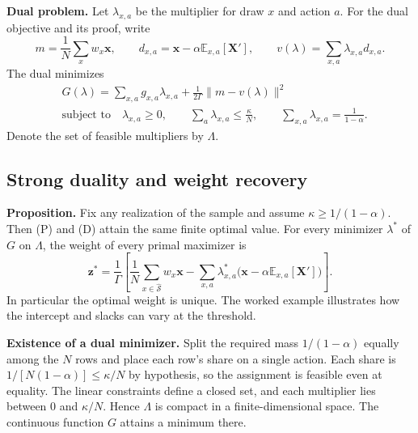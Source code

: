 \documentclass[12pt,a4paper]{article}
\numberwithin{equation}{section}
\newcommand{\norm}[1]{\lVert #1\rVert}
\newcommand{\lead}[1]{\par\smallskip\noindent\textbf{#1}\enspace}
\begin{document}
\lead{Dual problem.} Let \(\lambda_{x,a}\) be the multiplier for draw \(x\)
and action \(a\). For the dual objective and its proof, write
\[
 m=\frac1N\sum_x w_x\mathbf x,\qquad
 d_{x,a}=\mathbf x-\alpha\mathbb E_{x,a}[\mathbf X'],\qquad
 v(\lambda)=\sum_{x,a}\lambda_{x,a}d_{x,a}.
\]
The dual minimizes
\[
 \begin{aligned}
   &G(\lambda)=\sum_{x,a}g_{x,a}\lambda_{x,a}
       +\frac{1}{2\Gamma}\norm{m-v(\lambda)}^2\\
   &\text{subject to}\quad \lambda_{x,a}\ge0,\qquad
        \sum_a\lambda_{x,a}\le\frac{\kappa}{N},\qquad
        \sum_{x,a}\lambda_{x,a}=\frac{1}{1-\alpha}.
 \end{aligned}
 \tag{D}
\]
Denote the set of feasible multipliers by \(\Lambda\).

\newpage
\subsection*{Strong duality and weight recovery}
\textbf{Proposition.} Fix any realization of the sample and assume
\(\kappa\ge 1/(1-\alpha)\). Then (P) and (D) attain the same finite optimal
value. For every minimizer \(\lambda^*\) of \(G\) on \(\Lambda\), the weight
of every primal maximizer is
\begin{equation}
 \mathbf z^*=\frac{1}{\Gamma}\left[
     \frac1N\sum_{x\in\widehat{\mathcal S}} w_x\mathbf x
     -\sum_{x,a}\lambda^*_{x,a}
        \bigl(\mathbf x-\alpha\mathbb E_{x,a}[\mathbf X']\bigr)\right].
 \label{eq:weight}
\end{equation}
In particular the optimal weight is unique. The worked example illustrates
how the intercept and slacks can vary at the threshold.

\lead{Existence of a dual minimizer.}
Split the required mass \(1/(1-\alpha)\) equally among the \(N\) rows and
place each row's share on a single action. Each share is
\(1/[N(1-\alpha)]\le\kappa/N\) by hypothesis, so the assignment is feasible
even at equality. The linear constraints define a closed set, and each
multiplier lies between \(0\) and \(\kappa/N\). Hence \(\Lambda\) is
compact in a finite-dimensional space. The continuous function \(G\)
attains a minimum there.
\end{document}

